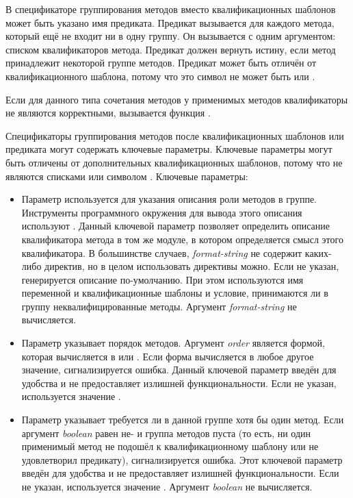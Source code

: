 \begin{defmac}
В спецификаторе группирования методов вместо квалификационных шаблонов может
быть указано имя предиката. Предикат вызывается для каждого метода, который ещё
не входит ни в одну группу. Он вызывается с одним аргументом: списком
квалификаторов метода. Предикат должен вернуть истину, если метод принадлежит
некоторой группе методов. Предикат может быть отличён от квалификационного
шаблона, потому что это символ не может быть  или \cdf{*}.

Если для данного типа сочетания методов у применимых методов квалификаторы не
являются корректными, вызывается функция .

Спецификаторы группирования методов после квалификационных шаблонов или
предиката могут содержать ключевые параметры. Ключевые параметры могут быть
отличены от дополнительных квалификационных шаблонов, потому что не являются
списками или символом \cdf{*}. Ключевые параметры:

\begin{itemize}

\item 
Параметр  используется для указания описания роли методов в
группе. Инструменты программного окружения для вывода этого описания используют
. Данный ключевой параметр позволяет определить описание
квалификатора метода в том же модуле, в котором определяется смысл этого
квалификатора. В большинстве случаев, \emph{format-string} не содержит каких-либо
директив, но в целом использовать директивы можно. Если  не
указан, генерируется описание по-умолчанию. При этом используются имя переменной
и квалификационные шаблоны и условие, принимаются ли в группу
неквалифицированные методы. Аргумент \emph{format-string} не вычисляется.

\item 
Параметр  указывает порядок методов. Аргумент \emph{order} является
формой, которая вычисляется в  или
. Если форма вычисляется в любое другое значение,
сигнализируется ошибка. Данный ключевой параметр введён для удобства и не
предоставляет излишней функциональности.
Если  не указан, используется значение .

\item 
Параметр  указывает требуется ли в данной группе хотя бы один
метод. Если аргумент \emph{boolean} равен не- и группа методов пуста
(то есть, ни один применимый метод не подошёл к квалификационному шаблону или не
удовлетворил предикату), сигнализируется ошибка. Этот ключевой параметр введён
для удобства и не предоставляет излишней функциональности. Если  не
указан, используется значение . Аргумент \emph{boolean} не вычисляется.
\end{itemize}


\end{defmac}
